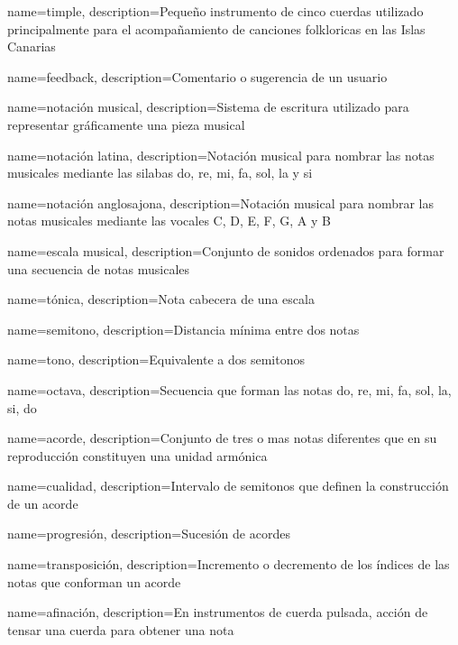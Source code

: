 {
    name=timple,
    description={Pequeño instrumento de cinco cuerdas utilizado principalmente para el acompañamiento de canciones folkloricas en las Islas Canarias}
}

{
    name=feedback,
    description={Comentario o sugerencia de un usuario}
}

{
    name=notación musical,
    description={Sistema de escritura utilizado para representar gráficamente una pieza musical}
}

{
    name=notación latina,
    description={Notación musical para nombrar las notas musicales mediante las silabas do, re, mi, fa, sol, la y si}
}

{
    name=notación anglosajona,
    description={Notación musical para nombrar las notas musicales mediante las vocales C, D, E, F, G, A y B}
}

{
    name=escala musical,
    description={Conjunto de sonidos ordenados para formar una secuencia de notas musicales}
}

{
    name=tónica,
    description={Nota cabecera de una escala}
}

{
    name=semitono,
    description={Distancia mínima entre dos notas}
}

{
    name=tono,
    description={Equivalente a dos semitonos}
}


{
    name=octava,
    description={Secuencia que forman las notas do, re, mi, fa, sol, la, si, do}
}

{
    name=acorde,
    description={Conjunto de tres o mas notas diferentes que en su reproducción constituyen una unidad armónica}
}

{
    name=cualidad,
    description={Intervalo de semitonos que definen la construcción de un acorde}
}

{
    name=progresión,
    description={Sucesión de acordes}
}

{
    name=transposición,
    description={Incremento o decremento de los índices de las notas que conforman un acorde}
}

{
    name=afinación,
    description={En instrumentos de cuerda pulsada, acción de tensar una cuerda para obtener una nota}
}

